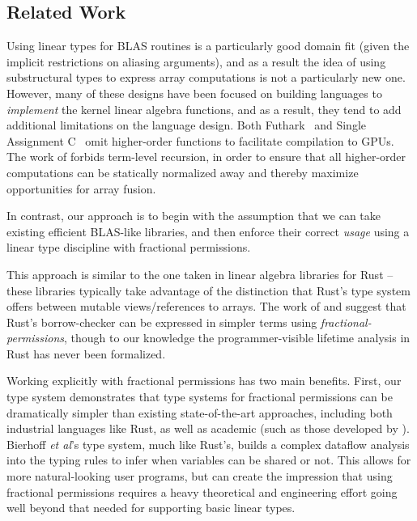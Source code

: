 \subsection{Related Work}

Using linear types for BLAS routines is a particularly good domain fit
(given the implicit restrictions on aliasing arguments), and as a
result the idea of using substructural types to express array
computations is not a particularly new
one\cite{scholz,henriksen,bernardy2016}.  However, many of these
designs have been focused on building languages to \emph{implement}
the kernel linear algebra functions, and as a result, they tend to add
additional limitations on the language design. Both
Futhark~\cite{henriksen} and Single Assignment C~\cite{scholz} omit
higher-order functions to facilitate compilation to GPUs. The work of
\cite{bernardy2016} forbids term-level recursion, in order to ensure
that all higher-order computations can be statically normalized away
and thereby maximize opportunities for array fusion.

In contrast, our approach is to begin with the assumption that we can
take existing efficient BLAS-like libraries, and then enforce their
correct \emph{usage} using a linear type discipline with fractional
permissions. 

This approach is similar to the one taken in linear algebra libraries
for Rust -- these libraries typically take advantage of the
distinction that Rust's type system offers between mutable
views/references to arrays.  The work of \cite{weiss} and
\cite{rustbelt} suggest that Rust's borrow-checker can be expressed
in simpler terms using \emph{fractional-permissions}, though to our
knowledge the programmer-visible lifetime analysis in Rust has never
been formalized.

Working explicitly with fractional permissions has two main
benefits. First, our type system demonstrates that type systems for
fractional permissions can be dramatically simpler than existing
state-of-the-art approaches, including both industrial languages like
Rust, as well as academic (such as those developed by
\cite{bierhoff}).  Bierhoff \emph{et al}'s type system, much like
Rust's, builds a complex dataflow analysis into the typing rules to
infer when variables can be shared or not. This allows for more
natural-looking user programs, but can create the impression that
using fractional permissions requires a heavy theoretical and
engineering effort going well beyond that needed for supporting basic
linear types.

